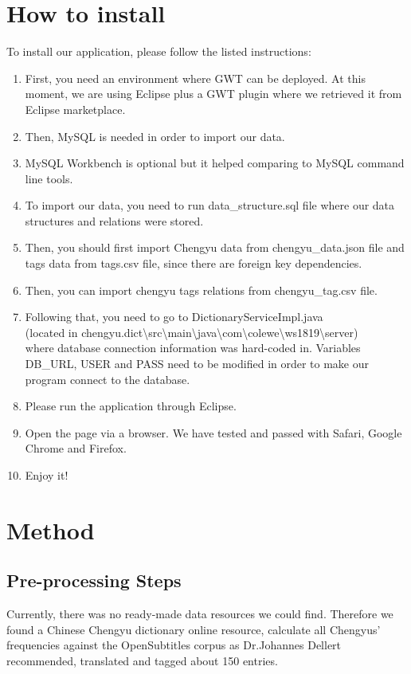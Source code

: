\documentclass[11pt]{article} %
\begin{document}
\section{How to install}
To install our application, please follow the listed instructions:

\begin{enumerate}
  \item First, you need an environment where GWT can be deployed. At this moment, we are using Eclipse plus a GWT plugin where we retrieved it from Eclipse marketplace.
  \item Then, MySQL is needed in order to import our data.
  \item MySQL Workbench is optional but it helped comparing to MySQL command line tools.
  \item To import our data, you need to run data\_structure.sql file where our data structures and relations were stored.
  \item Then, you should first import Chengyu data from chengyu\_data.json file and tags data from tags.csv file, since there are foreign key dependencies.
  \item Then, you can import chengyu tags relations from chengyu\_tag.csv file.
  \item Following that, you need to go to DictionaryServiceImpl.java \\(located in chengyu.dict\textbackslash src\textbackslash main\textbackslash java\textbackslash com\textbackslash colewe\textbackslash ws1819\textbackslash server)\\ where database connection information was hard-coded in. Variables DB\_URL, USER and PASS need to be modified in order to make our program connect to the database.
  \item Please run the application through Eclipse.
  \item Open the page  via a browser. We have tested and passed with Safari, Google Chrome and Firefox.
  \item Enjoy it!
\end{enumerate}

\section{Method}
\subsection{Pre-processing Steps}
\indent Currently, there was no ready-made data resources we could find. Therefore we found a Chinese Chengyu dictionary online resource, calculate all Chengyus' frequencies against the OpenSubtitles corpus as Dr.Johannes Dellert recommended, translated and tagged about 150 entries.
\end{document}
